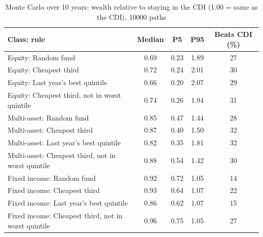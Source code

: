 \begin{table}[htbp]\centering
\caption{Monte Carlo over 10 years: wealth relative to staying in the CDI (1.00 = same as the CDI), 10000 paths}
\begin{tabular}{lcccc}
\toprule
Class: rule & Median & P5 & P95 & Beats CDI (\%) \\
\midrule
Equity: Random fund & 0.69 & 0.23 & 1.89 & 27 \\
Equity: Cheapest third & 0.72 & 0.24 & 2.01 & 30 \\
Equity: Last year's best quintile & 0.66 & 0.20 & 2.07 & 29 \\
Equity: Cheapest third, not in worst quintile & 0.74 & 0.26 & 1.94 & 31 \\
\midrule
Multi-asset: Random fund & 0.85 & 0.47 & 1.44 & 28 \\
Multi-asset: Cheapest third & 0.87 & 0.40 & 1.50 & 32 \\
Multi-asset: Last year's best quintile & 0.82 & 0.35 & 1.81 & 32 \\
Multi-asset: Cheapest third, not in worst quintile & 0.88 & 0.54 & 1.42 & 30 \\
\midrule
Fixed income: Random fund & 0.92 & 0.72 & 1.05 & 14 \\
Fixed income: Cheapest third & 0.93 & 0.64 & 1.07 & 22 \\
Fixed income: Last year's best quintile & 0.86 & 0.62 & 1.07 & 15 \\
Fixed income: Cheapest third, not in worst quintile & 0.96 & 0.75 & 1.05 & 27 \\
\bottomrule
\end{tabular}
\end{table}

